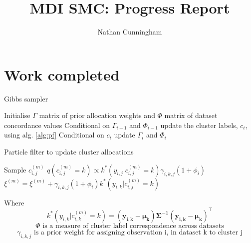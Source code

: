 \documentclass[10pt,a4paper]{article}
\author{Nathan Cunningham}
\title{MDI SMC: Progress Report}
\begin{document}
\maketitle

\section*{Work completed}
\begin{algorithm}
\caption{Gibbs sampler}
 \begin{algorithmic}[1]
  \State Initialise $\Gamma$ matrix of prior allocation weights and $\Phi$ matrix of dataset concordance values
  \State Conditional on $\Gamma_{i-1}$ and $\Phi_{i-1}$ update the cluster labels, $c_{i}$, using alg. \ref{alg:pf}
  \State Conditional on $c_{i}$ update $\Gamma_i$ and $\Phi_i$
  \EndFor
\end{algorithmic}
\end{algorithm}


\begin{algorithm}
\caption{Particle filter to update cluster allocations}
\label{alg:pf}
 \begin{algorithmic}[1]
   
   
   
  \State Sample $c^{(m)}_{i, j}$ 
  \State $q(c^{(m)}_{i,j} = k) \propto k^*(y_{i,j}|c_{i,j}^{(m)} = k) \gamma_{i, k, j}(1+\phi_{i})$
  \State $\xi^(m) =  \xi^(m) + \gamma_{i, k, j}(1+\phi_{i})k^*(y_{i,k}|c_{i,j}^{(m)} = k)$ 
  \EndFor
  \EndFor
  \EndFor

\end{algorithmic}
\end{algorithm}

Where
\begin{equation}
\label{eq:likelihood}
k^*(y_{i, k}|c_{i, k}^{(m)} = k) = (\mathbf{y_{i, k}} - \mathbf{\mu_k}) \mathbf{\Sigma^{-1}} (\mathbf{y_{i, k}} - \mathbf{\mu_k})^\top
\end{equation}
\begin{equation}
\label{eq:phi}
\Phi \text{ is a measure of cluster label correspondence across datasets}
\end{equation}
\begin{equation}
\label{eq:gamma}
\gamma_{i, k, j} \text{ is a prior weight for assigning observation i, in dataset k to cluster j}
\end{equation}
\end{document}

